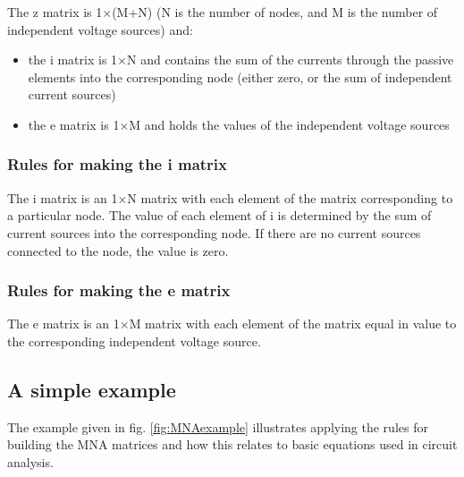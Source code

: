 \documentclass[10pt]{report}
\begin{document}
The z matrix is 1$\times$(M+N) (N is the number of nodes, and M is the
number of independent voltage sources) and:

\begin{itemize}
\item
the i matrix is 1$\times$N and contains the sum of the currents through the
passive elements into the corresponding node (either zero, or the sum
of independent current sources)
\item
the e matrix is 1$\times$M and holds the values of the independent
voltage sources
\end{itemize}

\subsubsection{Rules for making the i matrix}

The i matrix is an 1$\times$N matrix with each element of the matrix
corresponding to a particular node.  The value of each element of i is
determined by the sum of current sources into the corresponding node.
If there are no current sources connected to the node, the value is
zero.

\subsubsection{Rules for making the e matrix}

The e matrix is an 1$\times$M matrix with each element of the matrix
equal in value to the corresponding independent voltage source.

\subsection{A simple example}

The example given in fig. \ref{fig:MNAexample} illustrates applying
the rules for building the MNA matrices and how this relates to basic
equations used in circuit analysis.
\end{document}
